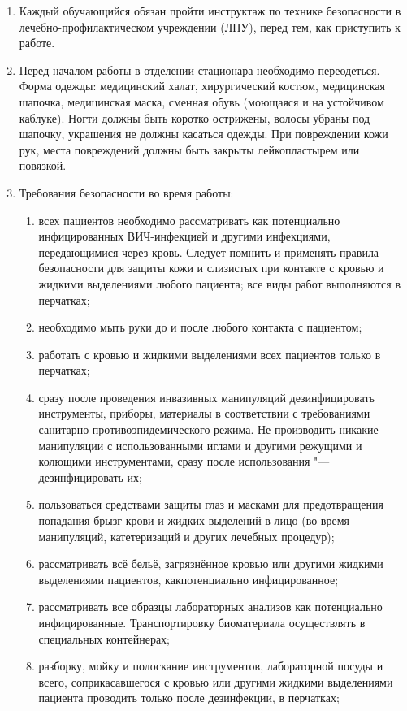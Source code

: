 \documentclass[a4paper,12pt]{extarticle}
\begin{document}
\begin{enumerate}
\item Каждый обучающийся обязан пройти инструктаж по технике безопасности в лечебно-профилактическом учреждении (ЛПУ), перед тем, как приступить к работе.
\item Перед  началом  работы  в  отделении  стационара  необходимо  переодеться.
Форма одежды: медицинский халат, хирургический костюм, медицинская шапочка, медицинская маска, сменная обувь (моющаяся и на устойчивом каблуке).
Ногти должны быть коротко острижены, волосы убраны под шапочку, украшения не должны касаться одежды.
При повреждении кожи рук, места повреждений  должны быть закрыты лейкопластырем или повязкой.
\item Требования безопасности во время работы:

\begin{enumerate}
\item всех  пациентов  необходимо  рассматривать  как  потенциально  инфицированных ВИЧ-инфекцией  и  другими инфекциями,  передающимися  через  кровь.  Следует помнить и применять правила безопасности для защиты кожи и слизистых при контакте  с  кровью  и  жидкими  выделениями  любого  пациента;  все  виды  работ выполняются в перчатках;
\item необходимо мыть руки до и после любого контакта с пациентом;
\item работать с кровью и жидкими выделениями всех пациентов только в перчатках;
\item сразу после проведения инвазивных манипуляций дезинфицировать инструменты, приборы,   материалы   в   соответствии   с   требованиями   санитарно\hyp{}противоэпидемического  режима.  Не  производить  никакие  манипуляции  с использованными иглами и другими режущими и колющими инструментами, сразу после использования "--- дезинфицировать их;
\item пользоваться средствами защиты глаз и масками для предотвращения попадания брызг крови и жидких выделений в лицо (во время манипуляций, катетеризаций и других лечебных процедур);
\item рассматривать всё бельё, загрязнённое кровью или другими жидкими выделениями пациентов, какпотенциально инфицированное;
\item рассматривать  все  образцы  лабораторных  анализов  как  потенциально инфицированные.  Транспортировку  биоматериала  осуществлять  в  специальных контейнерах;
\item разборку,  мойку  и  полоскание  инструментов,  лабораторной  посуды  и  всего, соприкасавшегося  с  кровью  или  другими  жидкими  выделениями  пациента проводить только после дезинфекции, в перчатках;

\end{enumerate}
\end{enumerate}
\end{document}
